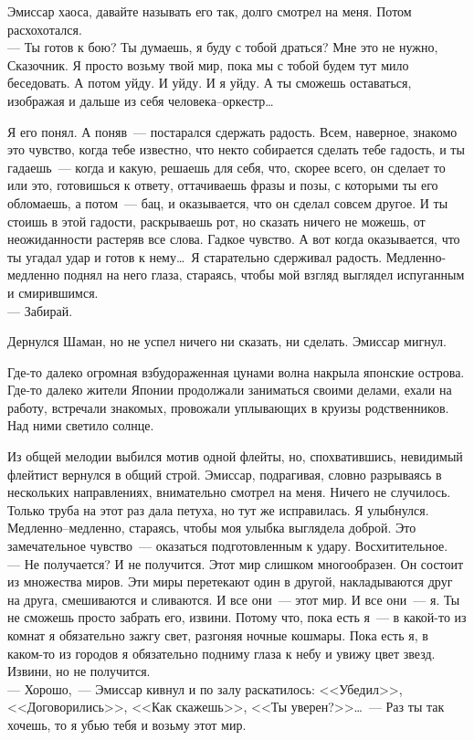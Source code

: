 Эмиссар хаоса, давайте называть его так, долго смотрел на меня. Потом 
расхохотался.\\
--- Ты готов к бою? Ты думаешь, я буду с тобой драться? Мне это не нужно, 
Сказочник. Я просто возьму твой мир, пока мы с тобой будем тут мило беседовать. 
А потом уйду. И уйду. И я уйду. А ты сможешь оставаться, изображая и дальше из 
себя человека--оркестр\ldots

Я его понял. А поняв~--- постарался сдержать радость. Всем, наверное, знакомо 
это чувство, когда тебе известно, что некто собирается сделать тебе гадость, и ты 
гадаешь~--- когда и какую, решаешь для себя, что, скорее всего, он сделает то 
или это, готовишься к ответу, оттачиваешь фразы и позы, с которыми ты его 
обломаешь, а потом~--- бац, и оказывается, что он сделал совсем другое. И ты стоишь в этой 
гадости, раскрываешь рот, но сказать ничего не можешь, от неожиданности 
растеряв все слова. Гадкое чувство. А вот когда оказывается, что ты угадал удар и готов 
к нему\ldots\ Я старательно сдерживал радость. Медленно-медленно поднял на него 
глаза, стараясь, чтобы мой взгляд выглядел испуганным и смирившимся.\\
--- Забирай.

Дернулся Шаман, но не успел ничего ни сказать, ни сделать. Эмиссар мигнул.

Где-то далеко огромная взбудораженная цунами волна накрыла японские острова. 
Где-то далеко жители Японии продолжали заниматься своими делами, ехали на 
работу, встречали знакомых, провожали уплывающих в круизы родственников. Над 
ними светило солнце.

Из общей мелодии выбился мотив одной флейты, но, спохватившись, невидимый 
флейтист вернулся в общий строй. Эмиссар, подрагивая, словно разрываясь в 
нескольких направлениях, внимательно смотрел на меня. Ничего не случилось. 
Только труба на этот раз дала петуха, но тут же исправилась. Я улыбнулся. 
Медленно--медленно, стараясь, чтобы моя улыбка выглядела доброй. Это 
замечательное чувство~--- оказаться подготовленным к удару. Восхитительное.\\
--- Не получается? И не получится. Этот мир слишком многообразен. Он состоит из 
множества миров. Эти миры перетекают один в другой, накладываются друг на 
друга, смешиваются и сливаются. И все они~--- этот мир. И все они~--- я. Ты не сможешь 
просто забрать его, извини. Потому что, пока есть я~--- в какой-то из комнат я 
обязательно зажгу свет, разгоняя ночные кошмары. Пока есть я, в каком-то из 
городов я обязательно подниму глаза к небу и увижу цвет звезд. Извини, но не 
получится.\\
--- Хорошо,~--- Эмиссар кивнул и по залу раскатилось: <<Убедил>>, 
<<Договорились>>, <<Как скажешь>>, <<Ты уверен?>>\ldots~--- Раз ты так хочешь, то я убью тебя и возьму 
этот мир.

